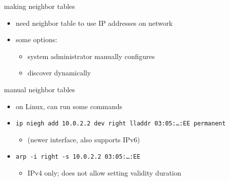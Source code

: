 \begin{frame}{making neighbor tables}
    \begin{itemize}
    \item need neighbor table to use IP addresses on network
    \vspace{.5cm}
    \item some options:
        \begin{itemize}
        \item system administrator manually configures
        \item discover dynamically
        \end{itemize}
    \end{itemize}
\end{frame}

\begin{frame}{manual neighbor tables}
\begin{itemize}
\item on Linux, can run some commands
\vspace{.5cm}
\item {\tt ip niegh add 10.0.2.2 dev right lladdr 03:05:\ldots:EE permanent}
    \begin{itemize}
    \item (newer interface, also supports IPv6)
    \end{itemize}
\item {\tt arp -i right -s 10.0.2.2 03:05:\ldots:EE}
    \begin{itemize}
    \item IPv4 only; does not allow setting validity duration
    \end{itemize}
\end{itemize}
\end{frame}
